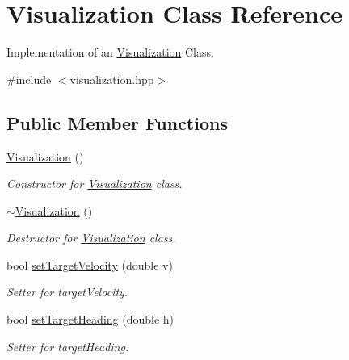 \hypertarget{classVisualization}{}\section{Visualization Class Reference}
\label{classVisualization}


Implementation of an \hyperlink{classVisualization}{Visualization} Class.  




{\ttfamily \#include $<$visualization.\+hpp$>$}

\subsection*{Public Member Functions}
\begin{DoxyCompactItemize}
\item 
\mbox{\label{classVisualization_a8497cb6ad7ad879f25ebb46c0f2485e0}} 
\hyperlink{classVisualization_a8497cb6ad7ad879f25ebb46c0f2485e0}{Visualization} ()
\begin{DoxyCompactList}\small\item\em Constructor for \hyperlink{classVisualization}{Visualization} class. \end{DoxyCompactList}\item 
\mbox{\label{classVisualization_a1b3dc8c07a781aaf8f4cbe95031e191c}} 
\hyperlink{classVisualization_a1b3dc8c07a781aaf8f4cbe95031e191c}{$\sim$\+Visualization} ()
\begin{DoxyCompactList}\small\item\em Destructor for \hyperlink{classVisualization}{Visualization} class. \end{DoxyCompactList}\item 
bool \hyperlink{classVisualization_a2da76ae59decde5ba33e4568c59b599c}{set\+Target\+Velocity} (double v)
\begin{DoxyCompactList}\small\item\em Setter for target\+Velocity. \end{DoxyCompactList}\item 
bool \hyperlink{classVisualization_ad56ef7f27e4b904cb719d6286795a791}{set\+Target\+Heading} (double h)
\begin{DoxyCompactList}\small\item\em Setter for target\+Heading. \end{DoxyCompactList}\item 

\end{DoxyCompactItemize}
